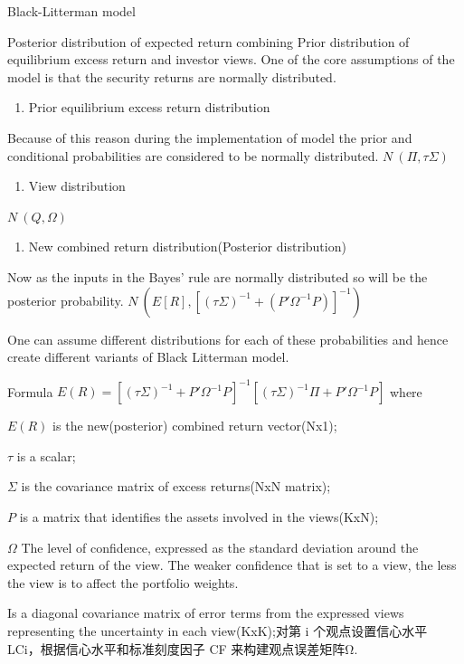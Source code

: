 \documentclass[presentation]{beamer}
\begin{document}
\begin{frame}[label={sec:orgheadline24}]{Black-Litterman model}
\begin{block}{Posterior distribution of expected return combining Prior distribution of equilibrium excess return and investor views.}
One of the core assumptions of the model is that the security returns are normally distributed.

\begin{enumerate}
\item Prior equilibrium excess return distribution
\end{enumerate}
Because of this reason during the implementation of model the prior and conditional probabilities are considered to be normally distributed.
\(N~(\Pi, \tau\Sigma)\)

\begin{enumerate}
\item View distribution
\end{enumerate}
\(N~(Q, \Omega)\)

\begin{enumerate}
\item New combined return distribution(Posterior distribution)
\end{enumerate}
Now as the inputs in the Bayes’ rule are normally distributed so will be the posterior probability.
\(N~(E[R], [(\tau\Sigma)^{-1}+(P'\Omega^{-1}P)]^{-1})\)

One can assume different distributions for each of these probabilities and hence create different variants of Black Litterman model.
\end{block}

\begin{block}{Formula}
\(E(R)=[(\tau\Sigma)^{-1}+P'\Omega^{-1}P]^{-1}[(\tau\Sigma)^{-1}\Pi+P'\Omega^{-1}P]\)
where

\(E(R)\)
is the new(posterior) combined return vector(Nx1);

\(\tau\)
is a scalar;

\(\Sigma\)
is the covariance matrix of excess returns(NxN matrix);

\(P\)
is a matrix that identifies the assets involved in the views(KxN);

\(\Omega\)
The level of confidence, expressed as the standard deviation around the expected return of the view. The weaker confidence that is set to a view, the less the view is to affect the portfolio weights.

Is a diagonal covariance matrix of error terms from the expressed views representing the uncertainty in each view(KxK);对第 i 个观点设置信心水平 LCi，根据信心水平和标准刻度因子 CF 来构建观点误差矩阵Ω.


\end{block}
\end{frame}
\end{document}
